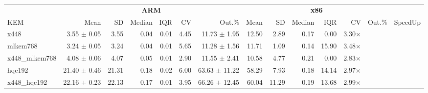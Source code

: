 \begin{table}[!ht]
\centering
\begin{tabular}{l|rrrrrr|rrrrrr|r}
\toprule
& \multicolumn{6}{c}{\bfseries ARM} & \multicolumn{6}{c}{\bfseries x86} & \\
\cmidrule(lr){2-7} \cmidrule(lr){8-13}
KEM 			& Mean & SD & Median & IQR & CV & Out.\% 		& Mean & SD & Median & IQR & CV & Out.\% & SpeedUp \\
\midrule
x448 			& 3.55  $\pm$ 0.05 & 3.55 & 0.04 & 0.01 & 4.45 	& 11.73 $\pm$  1.95 & 12.50 & 2.89 & 0.17 & 0.00 & 3.30× \\
mlkem768 		& 3.24  $\pm$ 0.05 & 3.24 & 0.04 & 0.01 & 5.65 	& 11.28 $\pm$  1.56 & 11.71 & 1.09 & 0.14 & 15.90 & 3.48× \\
x448_mlkem768 	& 4.08  $\pm$ 0.06 & 4.07 & 0.05 & 0.01 & 2.90 	& 11.55 $\pm$  2.41 & 10.58 & 4.77 & 0.21 & 0.00 & 2.83× \\
hqc192 			& 21.40 $\pm$ 0.46 & 21.31 & 0.18 & 0.02 & 6.00 & 63.63 $\pm$  11.22 & 58.29 & 7.93 & 0.18 & 14.14 & 2.97× \\
x448_hqc192 	& 22.16 $\pm$ 0.23 & 22.13 & 0.17 & 0.01 & 3.95 & 66.26 $\pm$  12.45 & 60.04 & 11.29 & 0.19 & 13.68 & 2.99× \\
\bottomrule
\end{tabular}
\end{table}
